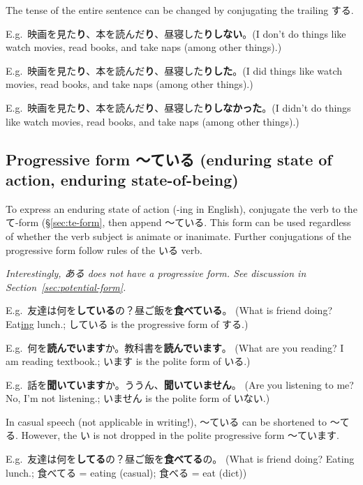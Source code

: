 \documentclass[../nihongo-gakushuu-kyouzai.tex]{subfiles}
\begin{document}
The tense of the entire sentence can be changed by conjugating the trailing する.

E.g.\ 映画を見た\textbf{り}、本を読んだ\textbf{り}、昼寝した\textbf{りしない}。(I don't do things like watch movies, read books, and take naps (among other things).)

E.g.\ 映画を見た\textbf{り}、本を読んだ\textbf{り}、昼寝した\textbf{りした}。(I did things like watch movies, read books, and take naps (among other things).)

E.g.\ 映画を見た\textbf{り}、本を読んだ\textbf{り}、昼寝した\textbf{りしなかった}。(I didn't do things like watch movies, read books, and take naps (among other things).)


\subsection{Progressive form 〜ている (enduring state of action, enduring state-of-being)} \label{sec:progressive-form}

To express an enduring state of action (-ing in English), conjugate the verb to the て-form (\S\ref{sec:te-form}, then append 〜ている. This form can be used regardless of whether the verb subject is animate or inanimate. Further conjugations of the progressive form follow rules of the いる verb.

\emph{Interestingly, ある does not have a progressive form. See discussion in Section~\ref{sec:potential-form}.}

E.g.\ 友達は何を\textbf{している}の？昼ご飯を\textbf{食べている}。 (What is friend doing? Eat\ul{ing} lunch.; している is the progressive form of する.)

E.g.\ 何を\textbf{読んでいます}か。教科書を\textbf{読んでいます}。 (What are you reading? I am reading textbook.; います is the polite form of いる.)

E.g.\ 話を\textbf{聞いています}か。ううん、\textbf{聞いていません}。 (Are you listening to me? No, I'm not listening.; いません is the polite form of いない.)

In casual speech (not applicable in writing!), 〜ている can be shortened to 〜てる. However, the い is not dropped in the polite progressive form 〜ています. 

E.g.\ 友達は何を\textbf{してる}の？昼ご飯を\textbf{食べてる}の。 (What is friend doing? Eating lunch.; 食べてる = eating (casual); 食べる = eat (dict))
\end{document}
